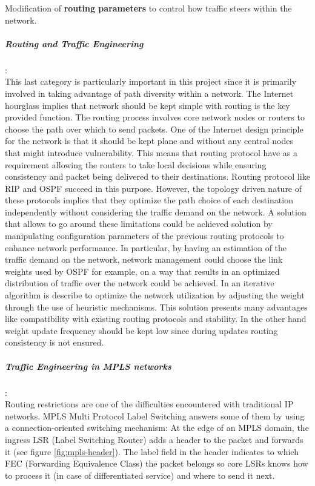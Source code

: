 Modification of {\bf routing parameters} to control how traffic steers within the network. 

\subparagraph{Routing and Traffic Engineering }:
\\This last category is particularly important in this project since it is primarily involved in taking advantage of path diversity within a network. The Internet hourglass implies that network should be kept simple with routing is the key provided function. The routing process involves core network nodes or routers to choose the path over which to send packets. One of the Internet design principle  for the network is that it should be kept plane and without any central nodes that might introduce  vulnerability. This means that routing protocol have as a requirement allowing the routers to take local decisions while ensuring consistency and packet being delivered to their destinations. Routing protocol like RIP and OSPF succeed in this purpose. However, the topology driven nature of these protocols implies that they optimize the path choice of each destination independently without considering the traffic demand on the network.  A solution that allows to go around these limitations could be achieved solution by manipulating configuration parameters of the previous routing protocols to enhance network performance.  In particular, by having an estimation of the traffic demand on the network, network management could choose the link weights  used by OSPF for example, on a way that results in an optimized distribution of traffic over the network could be achieved. In \cite{fortz00} an iterative algorithm is describe to optimize the network utilization by adjusting the weight through the use of heuristic mechanisms. This solution presents many advantages like compatibility with existing routing protocols and stability. In the other hand weight update frequency should be kept low since during updates routing consistency is not ensured.

\subparagraph{Traffic Engineering in MPLS networks}:
\\Routing restrictions are one of the difficulties encountered with traditional IP networks. MPLS  Multi Protocol Label Switching answers some of them by using a connection-oriented switching mechanism:  At the edge of an MPLS domain, the ingress LSR (Label Switching Router) adds a header to the packet and forwards it (see figure \ref{fig:mpls-header}). The label field in the header indicates to which FEC (Forwarding Equivalence Class) the packet belongs so core LSRs knows how to process it (in case of differentiated service) and where to send it next. 

